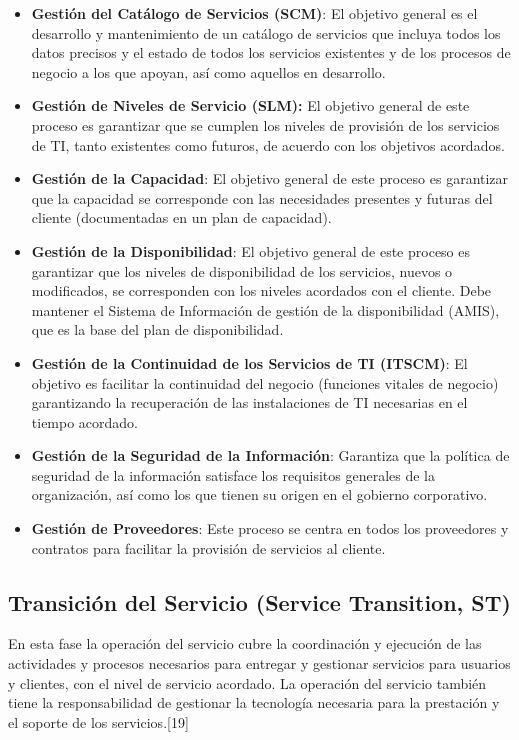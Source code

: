   
 \begin{itemize}
 	\item \textbf{Gestión del Catálogo de Servicios (SCM)}: El objetivo general es el desarrollo y mantenimiento de un catálogo de servicios que incluya todos los datos precisos y el estado de todos los servicios existentes y de los procesos de negocio a los que apoyan, así como aquellos en desarrollo. 
 	\item  \textbf{Gestión de Niveles de Servicio (SLM):} El objetivo general de este proceso es garantizar que se cumplen los niveles de provisión de los servicios de TI, tanto existentes como futuros, de acuerdo con los objetivos acordados. 
 	\item \textbf{Gestión de la Capacidad}: El objetivo general de este proceso es garantizar que la capacidad se corresponde con las necesidades presentes y futuras del cliente (documentadas en un plan de capacidad).
 	\item  \textbf{	Gestión de la Disponibilidad}: El objetivo general de este proceso es garantizar que los niveles de disponibilidad de los servicios, nuevos o modificados, se corresponden con los niveles acordados con el cliente. Debe mantener el Sistema de Información de gestión de la disponibilidad (AMIS), que es la base del plan de disponibilidad. 
 	 \item\textbf{ Gestión de la Continuidad de los Servicios de TI (ITSCM)}: El objetivo es facilitar la continuidad del negocio (funciones vitales de negocio) garantizando la recuperación de las instalaciones de TI necesarias en el tiempo acordado. 
 	 \item \textbf{Gestión de la Seguridad de la Información}: Garantiza que la política de seguridad de la información satisface los requisitos generales de la organización, así como los que tienen su origen en el gobierno corporativo.
 	\item \textbf{ Gestión de Proveedores}: Este proceso se centra en todos los proveedores y contratos para facilitar la provisión de servicios al cliente.
 	
 \end{itemize}
\subsection{Transición del Servicio (Service Transition, ST)}
En esta fase la operación del servicio cubre la coordinación y ejecución de las actividades y procesos necesarios para entregar y gestionar servicios para usuarios y clientes, con el nivel de servicio acordado. La operación del servicio también tiene la responsabilidad de gestionar la tecnología necesaria para la prestación y el soporte de los servicios.[19]

